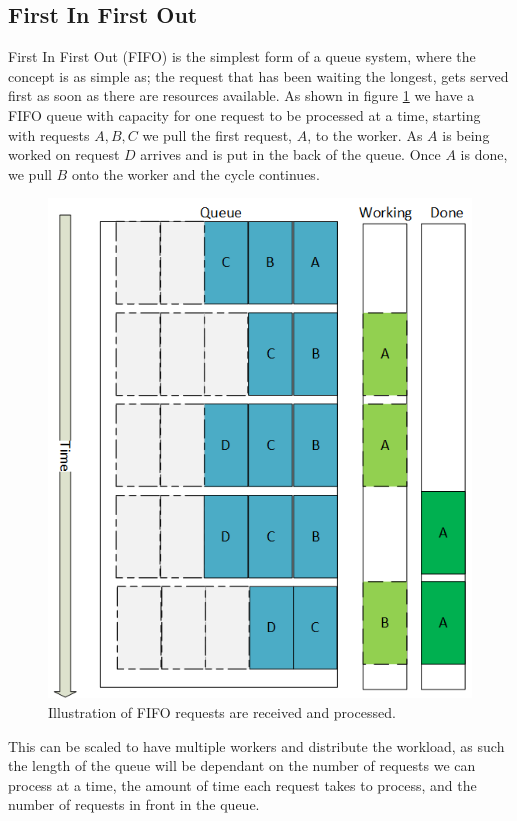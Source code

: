 \documentclass[../main.tex]{subfiles}
\begin{document}
\subsection{First In First Out}
First In First Out (FIFO) is the simplest form of a queue system, where the concept is as simple as; the request that has been waiting the longest, gets served first as soon as there are resources available. As shown in figure \ref{fig:fifo_drawing} we have a FIFO queue with capacity for one request to be processed at a time, starting with requests $A,B,C$ we pull the first request, $A$, to the worker. As $A$ is being worked on request $D$ arrives and is put in the back of the queue. Once $A$ is done, we pull $B$ onto the worker and the cycle continues.
\begin{figure}[H]
    \centering
    \includegraphics[scale=.75]{img/FIFO_drawing.png}
    \caption{Illustration of FIFO requests are received and processed.}
    \label{fig:fifo_drawing}
\end{figure}
This can be scaled to have multiple workers and distribute the workload, as such the length of the queue will be dependant on the number of requests we can process at a time, the amount of time each request takes to process, and the number of requests in front in the queue.
\end{document}
